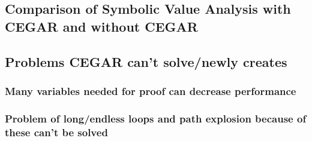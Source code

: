 \subsection{Comparison of Symbolic Value Analysis with CEGAR and without CEGAR}
\subsection{Problems CEGAR can't solve/newly creates}
\subsubsection{Many variables needed for proof can decrease performance}
\subsubsection{Problem of long/endless loops and path explosion because of these can't be solved}
